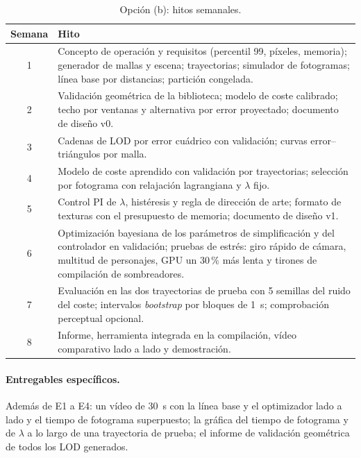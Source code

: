 \begin{table}[H]
\centering\small
\caption{Opción (b): hitos semanales.}\label{tab:hitos-b}
\begin{tabularx}{\textwidth}{@{}c>{\raggedright\arraybackslash}X@{}}
\toprule
Semana & Hito \\
\midrule
1 & Concepto de operación y requisitos (percentil 99, píxeles, memoria); generador de mallas y escena; trayectorias; simulador de fotogramas; línea base por distancias; partición congelada. \\
2 & Validación geométrica de la biblioteca; modelo de coste calibrado; techo por ventanas y alternativa por error proyectado; documento de diseño v0. \\
3 & Cadenas de LOD por error cuádrico con validación; curvas error--triángulos por malla. \\
4 & Modelo de coste aprendido con validación por trayectorias; selección por fotograma con relajación lagrangiana y $\lambda$ fijo. \\
5 & Control PI de $\lambda$, histéresis y regla de dirección de arte; formato de texturas con el presupuesto de memoria; documento de diseño v1. \\
6 & Optimización bayesiana de los parámetros de simplificación y del controlador en validación; pruebas de estrés: giro rápido de cámara, multitud de personajes, GPU un 30\,\% más lenta y tirones de compilación de sombreadores. \\
7 & Evaluación en las dos trayectorias de prueba con 5 semillas del ruido del coste; intervalos \emph{bootstrap} por bloques de 1~s; comprobación perceptual opcional. \\
8 & Informe, herramienta integrada en la compilación, vídeo comparativo lado a lado y demostración. \\
\bottomrule
\end{tabularx}
\end{table}

\paragraph{Entregables específicos.} Además de E1 a E4: un vídeo de 30~s con la línea base y el optimizador lado a lado y el tiempo de fotograma superpuesto; la gráfica del tiempo de fotograma y de $\lambda$ a lo largo de una trayectoria de prueba; el informe de validación geométrica de todos los LOD generados.

